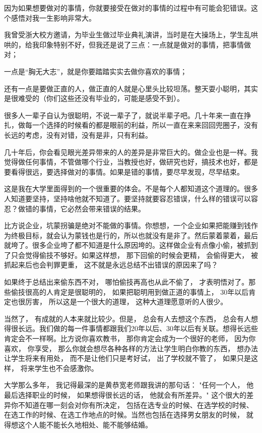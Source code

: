 因为如果想要做对的事情，你就要接受在做对的事情的过程中有可能会犯错误。这个感悟对我一生影响非常大。

我曾受浙大校方邀请，为毕业生做过毕业典礼演讲，当时是在大操场上，学生乱哄哄的，给我印象特别不好，但我还是说了三点：一点就是做对的事情，把事情做对；

一点是“胸无大志”，就是你要踏踏实实去做你喜欢的事情；

还有一点是要做正直的人，做正直的人就是心里头比较坦荡。整天耍小聪明，其实是很难受的（你们这些还没有毕业的，可能是感受不到）。

很多人一辈子自认为很聪明，不说一辈子了，就说半辈子吧。几十年来一直在挣扎，做每一个选择的时候看的都是眼前的利益，所以一直在来来回回兜圈子，没有长远的考虑，没有对错，没有是非，只有利益。

几十年后，你会看见眼光差异带来的人的差异是非常巨大的。做企业也是一样。我觉得做任何事情，不管做哪个行业，当教授也好，做研究也好，搞技术也好，都是要看得很远，要选择做对的事情。如果是错的事情，要尽早发现，尽早结束。

这是我在大学里面得到的一个很重要的体会。不是每个人都知道这个道理的。很多人知道要坚持，坚持啥他就不知道了。要坚持就要容忍错误，什么样的错误可以容忍？做错的事情，它必然会带来错误的结果。

比方说企业，坑蒙拐骗是绝对不能做的事情。你想想，一个企业如果把能赚到钱作为终极目标，就会认为蒙钱也是行的，所以也就没有是非了。然后蒙着蒙着，最后就垮了。很多企业垮了都不知道是什么原因垮的。这样做企业有点像小偷，被抓到了只会觉得偷技不够好。如果这样想， 那下回偷的时候会更精， 会偷得更大， 被抓起来后也会判罪更重， 这不就是永远总结不出错误的原因来了吗？

如果终于总结出来偷东西不对， 哪怕偷技再高也从此不偷了， 才表明悟对了。那些偷技很高的人肯定是很聪明的， 如果把聪明用到做正道的事情上， 30年以后肯定也很厉害， 所以这是一个很大的道理， 这种大道理愿意听的人很少。

当然了， 有成就的人本来就比较少。但是， 总会有人去想这个东西， 总会有人想得很长远。我们做的每一件事情都跟我们20年以后、30年以后有关联。想得长远些肯定会不一样啊。比方说你喜欢教书， 那你肯定会成为一个很好的老师， 因为你喜欢， 你享受， 那么你就会想尽各种各样的方法让学生明白你教的东西， 想办法让学生将来有用处， 而不是让他们只是考好试， 出了学校就不管了， 如果只是这样， 将来学生也不会感激你。

大学那么多年， 我记得最深的是黄恭宽老师跟我讲的那句话： "任何一个人， 他最后选择职业的时候， 如果想得很长远的话， 他就会有所差异。" 这个很大的差异你不知道在哪一刻会对你有所决定， 包括在选专业的时候、在选学校的时候、在选工作的时候、在选工作地点的时候。当然也包括在选择男女朋友的时候， 就得想这个人能不能长久地相处、能不能够结婚。

